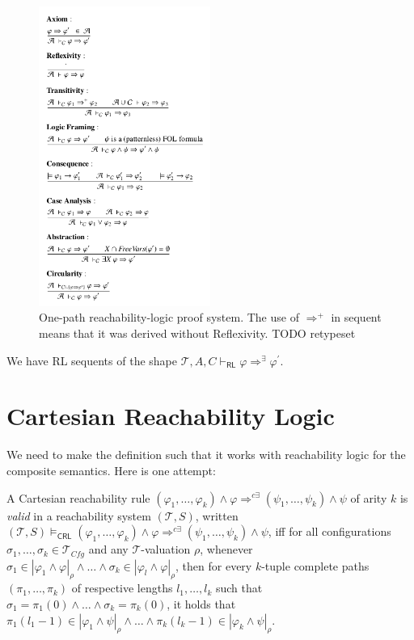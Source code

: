\documentclass{article}
\newcommand{\RL}{\mathsf{RL}}
\newcommand{\CRL}{\mathsf{CRL}}
\newcommand{\Tcfg}{\mathcal{T}_{\mathit{Cfg}}}
\begin{document}
\begin{definition}
\begin{figure}
    \centering
    \includegraphics[width=0.5\textwidth]{img/onepath-rl.png}
    \caption{One-path reachability-logic proof system.
    The use of $\Rightarrow^+$ in sequent means that it was derived without Reflexivity.
    TODO retypeset}
    \label{fig:RLproofsystem}
\end{figure}

We have RL sequents of the shape $\mathcal{T}, A, C \vdash_\RL \varphi \Rightarrow^\exists \varphi^\prime$.

\end{definition}

\section{Cartesian Reachability Logic}

We need to make the definition such that it works with reachability logic for the composite semantics.
Here is one attempt:
\begin{definition}\label{def:CRLsemantics}
A Cartesian reachability rule
$(\varphi_1,\ldots,\varphi_k) \land \varphi \Rightarrow^{c\exists} (\psi_1,\ldots,\psi_k) \land \psi$
of arity $k$
is \emph{valid} in a reachability system $(\mathcal{T}, S)$,
written
$(\mathcal{T}, S) \vDash_\CRL (\varphi_1,\ldots,\varphi_k) \land \varphi \Rightarrow^{c\exists}
(\psi_1,\ldots,\psi_k) \land \psi$,
iff for all configurations $\sigma_1,\ldots,\sigma_k \in \Tcfg$ and any $\mathcal{T}$-valuation $\rho$,
whenever $\sigma_1 \in |\varphi_1 \land \varphi|_\rho \land \ldots \land \sigma_k \in |\varphi_l \land \varphi|_\rho$,
then for every $k$-tuple complete paths $(\pi_1, \ldots, \pi_k)$
of respective lengths $l_1, \ldots, l_k$
such that
$\sigma_1 = \pi_1(0) \land \ldots \land \sigma_k = \pi_k(0)$,
it holds that 
$\pi_1(l_1-1) \in |\varphi_1 \land \psi|_\rho \land \ldots \land \pi_k(l_k-1) \in |\varphi_k \land \psi|_\rho$.
\end{definition}
\end{document}

